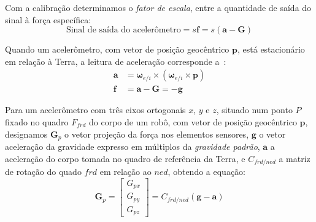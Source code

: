 Com a calibração determinamos o \textit{fator de escala}, entre a quantidade de saída do sinal à força específica\cite{Stevens2016}:
\begin{equation*} \tag{1.6-28}
    \text{Sinal de saída do acelerômetro} = s \mathbf{f} = s \left(\mathbf{a} - \mathbf{G} \right)
\end{equation*}

Quando um acelerômetro, com vetor de posição geocêntrico\footnotemark{} \(\mathbf{p}\), está estacionário em relação à Terra, a leitura de aceleração corresponde a~\cite{Stevens2016}:
\begin{align*}
    \mathbf{a} &= {\mathbf{\omega}_{e/i}}\!\times\!\left({\mathbf{\omega}_{e/i}}\!\times\!{\mathbf{p}}\right) \\
    \mathbf{f} &= \mathbf{a} - \mathbf{G} = -\!{\mathbf{g}} \tag{1.6-29}
\end{align*}

Para um acelerômetro com três eixos ortogonais \(x\), \(y\) e \(z\), situado num ponto \({P}\) fixado no quadro \({F}_{frd}\) do corpo de um robô, com vetor de posição geocêntrico \(\mathbf{p}\), designamos \(\mathbf{G}_{p}\) o vetor projeção da força nos elementos sensores, \(\mathbf{g}\) o vetor aceleração da gravidade expresso em múltiplos da \emph{gravidade padrão}, \(\mathbf{a}\) a aceleração do corpo tomada no quadro de referência da Terra, e \({C}_{frd/ned}\) a matriz de rotação do quado \(frd\) em relação ao \(ned\), obtendo a equação:
\begin{equation*}
    {\mathbf{G}}_p = \begin{bmatrix} {G}_{px} \\ {G}_{py} \\ {G}_{pz} \end{bmatrix} = {C}_{frd/ned}\left(\mathbf{g} - {\mathbf{a}}\right)
\end{equation*}

